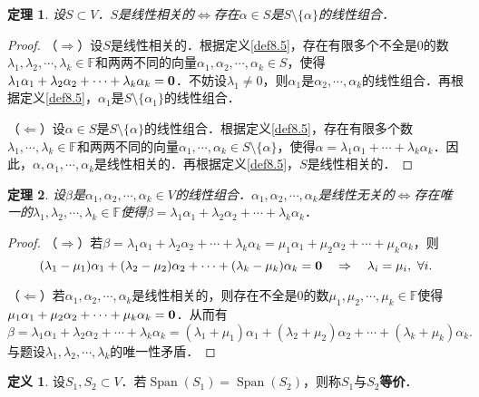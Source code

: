 \documentclass[a4paper,fontset=windows]{ctexbook}
\newtheorem{theorem}{定理}[chapter]
\theoremstyle{definition}
\newtheorem{definition}{定义}[chapter]
\DeclareMathOperator{\Span}{Span}
\begin{document}
\begin{theorem}
设$S\subset V$．$S$是线性相关的$\Leftrightarrow$存在$\alpha\in S$是$S\setminus\{\alpha\}$的线性组合．
\end{theorem}

\begin{proof}
（$\Rightarrow$）设$S$是线性相关的．根据定义\ref{def8.5}，存在有限多个不全是0的数$\lambda_1,\lambda_2,\cdots,\lambda_k\in\mathbb{F}$和两两不同的向量$\alpha_1,\alpha_2,\cdots,\alpha_k\in S$，使得$\lambda_1\alpha_1+\lambda_2\alpha_2+\cdots+\lambda_k\alpha_k={\bf 0}$．不妨设$\lambda_1\ne 0$，则$\alpha_1$是$\alpha_2,\cdots,\alpha_k$的线性组合．再根据定义\ref{def8.5}，$\alpha_1$是$S\setminus\{\alpha_1\}$的线性组合．

（$\Leftarrow$）设$\alpha\in S$是$S\setminus\{\alpha\}$的线性组合．根据定义\ref{def8.5}，存在有限多个数$\lambda_1,\cdots,\lambda_k\in\mathbb{F}$和两两不同的向量$\alpha_1,\cdots,\alpha_k\in S\setminus\{\alpha\}$，使得$\alpha=\lambda_1\alpha_1+\cdots+\lambda_k\alpha_k$．因此，$\alpha,\alpha_1,\cdots,\alpha_k$是线性相关的．再根据定义\ref{def8.5}，$S$是线性相关的．
\end{proof}

\begin{theorem}
设$\beta$是$\alpha_1,\alpha_2,\cdots,\alpha_k\in V$的线性组合．$\alpha_1,\alpha_2,\cdots,\alpha_k$是线性无关的$\Leftrightarrow$存在唯一的$\lambda_1,\lambda_2,\cdots,\lambda_k\in\mathbb{F}$使得$\beta=\lambda_1\alpha_1+\lambda_2\alpha_2+\cdots+\lambda_k\alpha_k$．
\end{theorem}

\begin{proof}
（$\Rightarrow$）若$\beta=\lambda_1\alpha_1+\lambda_2\alpha_2+\cdots+\lambda_k\alpha_k=\mu_1\alpha_1+\mu_2\alpha_2+\cdots+\mu_k\alpha_k$，则
$$(\lambda_1-\mu_1)\alpha_1+(\lambda_2-\mu_2)\alpha_2+\cdots+(\lambda_k-\mu_k)\alpha_k={\bf 0}\quad\Rightarrow\quad\lambda_i=\mu_i,~\forall i.$$

（$\Leftarrow$）若$\alpha_1,\alpha_2,\cdots,\alpha_k$是线性相关的，则存在不全是0的数$\mu_1,\mu_2,\cdots,\mu_k\in\mathbb{F}$使得$\mu_1\alpha_1+\mu_2\alpha_2+\cdots+\mu_k\alpha_k={\bf 0}$．从而有
$$\beta=\lambda_1\alpha_1+\lambda_2\alpha_2+\cdots+\lambda_k\alpha_k=(\lambda_1+\mu_1)\alpha_1+(\lambda_2+\mu_2)\alpha_2+\cdots+(\lambda_k+\mu_k)\alpha_k.$$
与题设$\lambda_1,\lambda_2,\cdots,\lambda_k$的唯一性矛盾．
\end{proof}

\begin{definition}
设$S_1,S_2\subset V$．若$\Span(S_1)=\Span(S_2)$，则称$S_1$与$S_2${\bf 等价}．
\end{definition}
\end{document}
